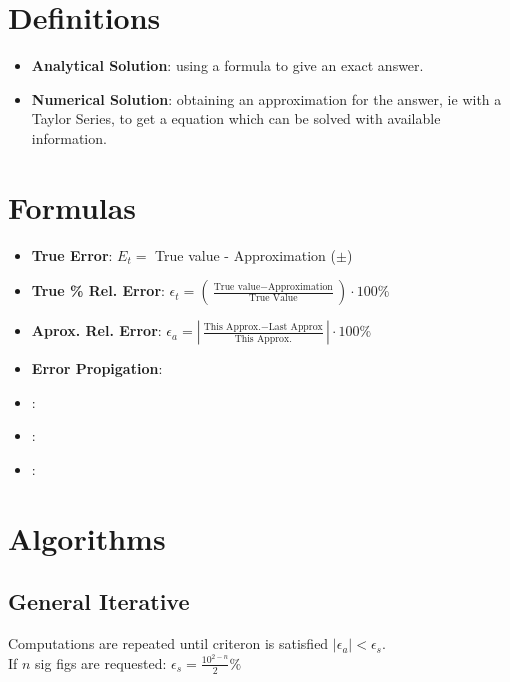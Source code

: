 \documentclass[fontsize=4pt]{scrartcl}
\begin{document}
\begin{multicols}{4}
  \section{Definitions}
    \begin{itemize}
      \item \textbf{Analytical Solution}: using a formula to give an exact answer.
      \item \textbf{Numerical Solution}: obtaining an approximation for the answer, 
            ie with a Taylor Series, to get a equation which can be solved with available
            information.
    \end{itemize}

  \section{Formulas}
    \parbox{\columnwidth}
    {
      \begin{itemize}
        \item \textbf{True Error}: $E_t =$ True value - Approximation ($\pm$)
        \item \textbf{True \% Rel. Error}: $\epsilon_t = (\frac{\text{True value} - \text{Approximation}}{\text{True Value}})\cdot100\%$
        \item \textbf{Aprox. Rel. Error}: $\epsilon_a =  |\frac{\text{This Approx.} - \text{Last Approx}}{\text{This Approx.}}|\cdot100\%$
        \item \textbf{Error Propigation}: 
        \item \textbf{}: 
        \item \textbf{}: 
        \item \textbf{}: 
      \end{itemize}
    }
  
  \columnbreak

  \section{Algorithms}
    \subsection{General Iterative}
      Computations are repeated until criteron is satisfied $|\epsilon_a| < \epsilon_s$. \\
      If $n$ sig figs are requested: $\epsilon_s = \frac{10^{2-n}}{2}\%$ \\

\end{multicols}
\end{document}
